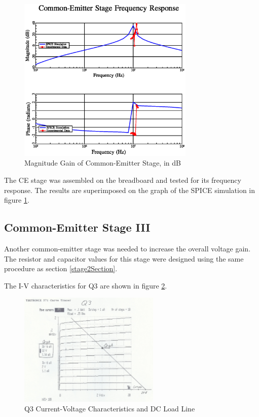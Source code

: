 \documentclass[titlepage, letterpaper, 10.5pt]{article}
\begin{document}
\begin{figure}[ht]
	\centering
	\includegraphics[width=0.75\textwidth]
		{mathGL/ceStage.eps}
	\caption{
		Magnitude Gain of Common-Emitter Stage, in dB
	}
	\label{CEstageMagnitudePlot}
\end{figure}

The CE stage was assembled on the breadboard and tested for its
frequency response. The results are superimposed on the graph of the
SPICE simulation in figure \ref{CEstageMagnitudePlot}.


\subsection{Common-Emitter Stage III}

Another common-emitter stage was needed to increase the overall
voltage gain. The resistor and capacitor values for this stage were
designed using the same procedure as section \ref{stage2Section}.

The I-V characteristics for Q3 are shown in figure 
\ref{q3Characteristics}.

\begin{figure}[ht]
	\centering
	\includegraphics[width=0.6\textwidth]
		{measurements/q3Characteristics}
	\caption{
		Q3 Current-Voltage Characteristics and DC Load Line
	}
	\label{q3Characteristics}
\end{figure}
\end{document}
